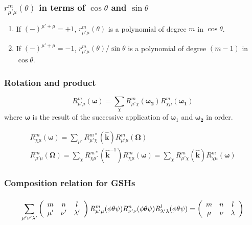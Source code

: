 \subsubsection*{$r_{\mu'\mu}^{m}(\theta)$ in terms of $\cos\theta$ and $\sin\theta$}
\begin{enumerate}
\item If $\left(-\right)^{\mu'+\mu}=+1$, $r_{\mu'\mu}^{m}(\theta)$ is
a polynomial of degree $m$ in $\cos\theta$.
\item If $\left(-\right)^{\mu'+\mu}=-1$, $r_{\mu'\mu}^{m}(\theta)/\sin\theta$
is a polynomial of degree $(m-1)$ in $\cos\theta$.
\end{enumerate}

\subsubsection*{Rotation and product}

\begin{equation}
R_{\mu'\mu}^{m}(\boldsymbol{\omega})=\sum_{\chi}R_{\mu'\chi}^{m}(\boldsymbol{\omega_{2}})R_{\chi\mu}^{m}(\boldsymbol{\omega_{1}})
\end{equation}
where $\boldsymbol{\omega}$ is the result of the successive application
of $\boldsymbol{\omega}_{1}$ and $\boldsymbol{\omega_{2}}$ in order.

\begin{equation}
\begin{array}{c}
{\displaystyle R_{\chi\mu}^{m}(\boldsymbol{\omega})=\sum_{\mu'}R_{\mu'\chi}^{m*}(\hat{\mathbf{k}})R_{\mu'\mu}^{m}(\mathbf{\Omega})}\\
{\displaystyle R_{\mu'\mu}^{m}(\mathbf{\Omega})=\sum_{\chi}R_{\chi\mu'}^{m*}(\hat{\mathbf{k}}^{-1})R_{\chi\mu}^{m}(\boldsymbol{\omega})=\sum_{\chi}R_{\mu'\chi}^{m}(\hat{\mathbf{k}})R_{\chi\mu}^{m}(\boldsymbol{\omega})}
\end{array}\label{eq:gsh-rotation}
\end{equation}


\subsubsection*{Composition relation for \acs{GSH}s}

\subsubsection*{
\begin{equation}
\sum_{\mu'\nu'\lambda'}\left(\protect\begin{array}{ccc}
m & n & l\protect\\
\mu' & \nu' & \lambda'
\protect\end{array}\right)R_{\mu'\mu}^{m}(\phi\theta\psi)R_{\nu'\nu}^{n}(\phi\theta\psi)R_{\lambda'\lambda}^{l}(\phi\theta\psi)=\left(\protect\begin{array}{ccc}
m & n & l\protect\\
\mu & \nu & \lambda
\protect\end{array}\right)\label{eq:gg.a91}
\end{equation}
}

